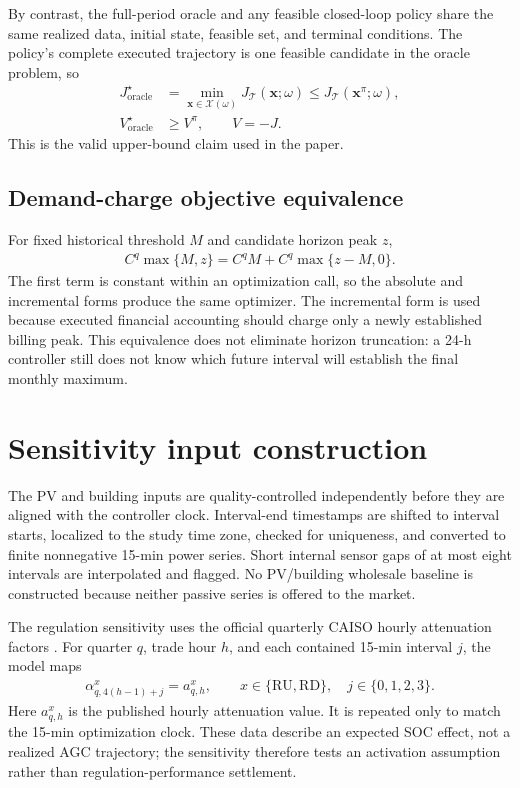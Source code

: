\documentclass[final,5p,times]{elsarticle}
\newcommand{\RU}{\mathrm{RU}}
\newcommand{\RD}{\mathrm{RD}}
\newcommand{\calT}{\mathcal{T}}
\begin{document}
By contrast, the full-period oracle and any feasible closed-loop policy share
the same realized data, initial state, feasible set, and terminal conditions.
The policy's complete executed trajectory is one feasible candidate in the
oracle problem, so
\begin{align}
J_{\mathrm{oracle}}^\star
&=\min_{\boldsymbol{x}\in\mathcal{X}(\omega)}J_{\calT}(\boldsymbol{x};\omega)
\le J_{\calT}(\boldsymbol{x}^{\pi};\omega), \label{eq:app_oracle_cost_proof}\\
V_{\mathrm{oracle}}^\star&\ge V^\pi,\qquad V=-J. \label{eq:app_oracle_value_proof}
\end{align}
This is the valid upper-bound claim used in the paper.

\subsection{Demand-charge objective equivalence}
For fixed historical threshold $M$ and candidate horizon peak $z$,
\begin{align}
C^q\max\{M,z\}
=C^qM+C^q\max\{z-M,0\}. \label{eq:app_demand_equivalence}
\end{align}
The first term is constant within an optimization call, so the absolute and incremental
forms produce the same optimizer. The incremental form is used because executed
financial accounting should charge only a newly established billing peak. This
equivalence does not eliminate horizon truncation: a 24-h controller still does
not know which future interval will establish the final monthly maximum.

\section{Sensitivity input construction}
\label{app:sensitivity_contract}

The PV and building inputs are quality-controlled independently before they are
aligned with the controller clock. Interval-end timestamps are shifted to
interval starts, localized to the study time zone, checked for uniqueness, and
converted to finite nonnegative 15-min power series. Short internal sensor gaps
of at most eight intervals are interpolated and flagged. No PV/building
wholesale baseline is constructed because neither passive series is offered to
the market.

The regulation sensitivity uses the official quarterly CAISO hourly
attenuation factors \cite{caisoAttenuation2025}. For quarter $q$, trade hour
$h$, and each contained 15-min interval $j$, the model maps
\begin{align}
\alpha_{q,4(h-1)+j}^{x}=a_{q,h}^{x},\qquad
x\in\{\RU,\RD\},\quad j\in\{0,1,2,3\}.\label{eq:app_alpha_mapping}
\end{align}
Here $a_{q,h}^{x}$ is the published hourly attenuation value. It is repeated
only to match the 15-min optimization clock. These data describe an expected
SOC effect, not a realized AGC trajectory; the sensitivity therefore tests an
activation assumption rather than regulation-performance settlement.
\end{document}
